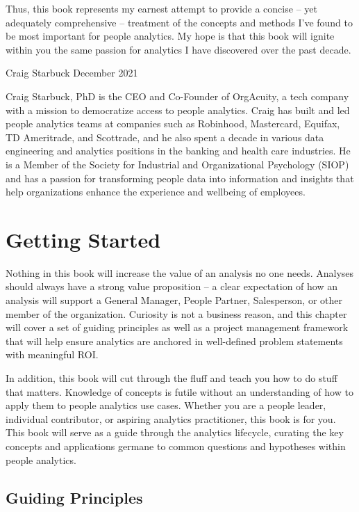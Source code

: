\documentclass[]{book}
\begin{document}
Thus, this book represents my earnest attempt to provide a concise -- yet adequately comprehensive -- treatment of the concepts and methods I've found to be most important for people analytics. My hope is that this book will ignite within you the same passion for analytics I have discovered over the past decade.

Craig Starbuck
December 2021

Craig Starbuck, PhD is the CEO and Co-Founder of OrgAcuity, a tech company with a mission to democratize access to people analytics. Craig has built and led people analytics teams at companies such as Robinhood, Mastercard, Equifax, TD Ameritrade, and Scottrade, and he also spent a decade in various data engineering and analytics positions in the banking and health care industries. He is a Member of the Society for Industrial and Organizational Psychology (SIOP) and has a passion for transforming people data into information and insights that help organizations enhance the experience and wellbeing of employees.

\hypertarget{get-started}{%
\chapter{Getting Started}\label{get-started}}

Nothing in this book will increase the value of an analysis no one needs. Analyses should always have a strong value proposition -- a clear expectation of how an analysis will support a General Manager, People Partner, Salesperson, or other member of the organization. Curiosity is not a business reason, and this chapter will cover a set of guiding principles as well as a project management framework that will help ensure analytics are anchored in well-defined problem statements with meaningful ROI.

In addition, this book will cut through the fluff and teach you how to do stuff that matters. Knowledge of concepts is futile without an understanding of how to apply them to people analytics use cases. Whether you are a people leader, individual contributor, or aspiring analytics practitioner, this book is for you. This book will serve as a guide through the analytics lifecycle, curating the key concepts and applications germane to common questions and hypotheses within people analytics.

\hypertarget{guiding-principles}{%
\section{Guiding Principles}\label{guiding-principles}}
\end{document}
